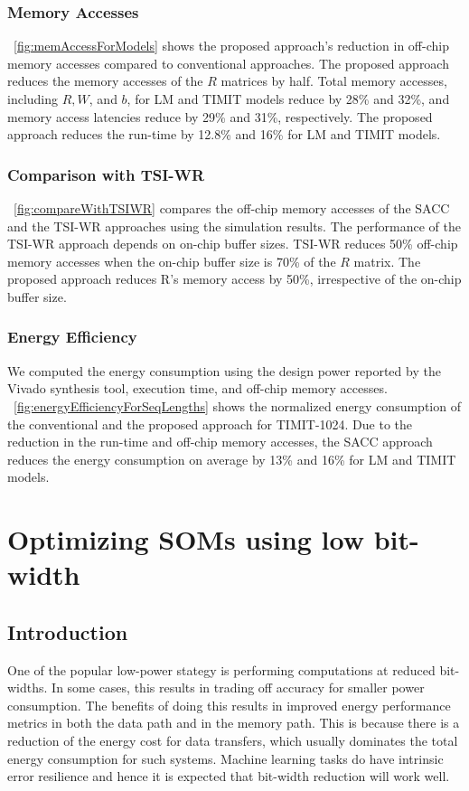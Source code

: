 \documentclass[a4paper,10pt]{article}
\begin{document}
\subsubsection{Memory Accesses}
\figurename{~\ref{fig:memAccessForModels}} shows the proposed approach's reduction in off-chip memory accesses compared to conventional approaches. The proposed approach reduces the memory accesses of the $R$ matrices by half. Total memory accesses, including $R, W$, and $b$, for LM and TIMIT models reduce by 28\% and 32\%, and memory access latencies reduce by 29\% and 31\%, respectively.
The proposed approach reduces the run-time by 12.8\% and 16\% for LM and TIMIT models. 
\subsubsection{Comparison with TSI-WR}
\figurename{~\ref{fig:compareWithTSIWR}} compares the off-chip memory accesses of the SACC and the TSI-WR approaches using the simulation results. The performance of the TSI-WR approach depends on on-chip buffer sizes. TSI-WR reduces 50\% off-chip memory accesses when the on-chip buffer size is 70\% of the $R$ matrix. The proposed approach reduces R's memory access by 50\%, irrespective of the on-chip buffer size.
\subsubsection{Energy Efficiency}
We computed the energy consumption using the design power reported by the Vivado synthesis tool, execution time, and off-chip memory accesses. \figurename{~\ref{fig:energyEfficiencyForSeqLengths}} shows the normalized energy consumption of the conventional and the proposed approach for TIMIT-1024. Due to the reduction in the run-time and off-chip memory accesses, the SACC approach reduces the energy consumption on average by 13\% and 16\% for LM and TIMIT models.


\section{Optimizing SOMs using low bit-width}
\subsection{Introduction}
One of the popular low-power stategy is performing computations at reduced bit-widths. In some cases, this results in trading off accuracy for smaller power consumption. The benefits of doing this results in improved energy performance metrics in both the data path and in the memory path. This is because there is a reduction of the energy cost for data transfers, which usually dominates the total energy consumption for such systems. Machine learning tasks do have intrinsic error resilience and hence it is expected that bit-width reduction will work well. 
\end{document}
